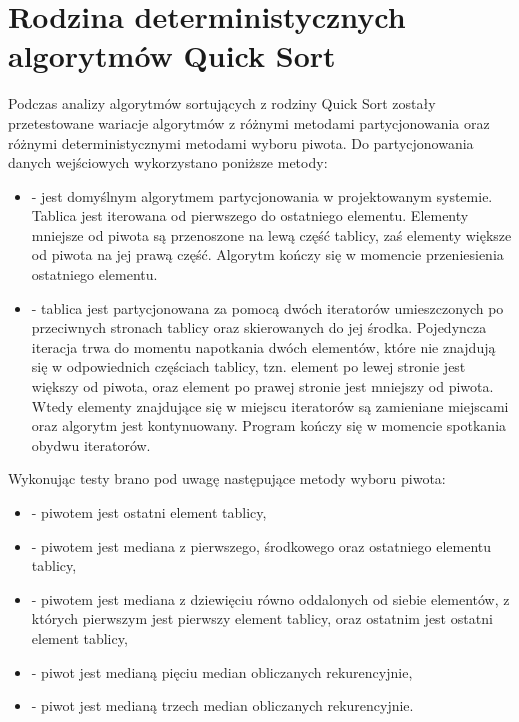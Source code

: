 \section{Rodzina deterministycznych algorytmów Quick Sort}
Podczas analizy algorytmów sortujących z rodziny Quick Sort zostały przetestowane wariacje algorytmów z różnymi metodami partycjonowania oraz różnymi deterministycznymi metodami wyboru piwota. Do partycjonowania danych wejściowych wykorzystano poniższe metody:

\begin{itemize}
	\setlength\itemsep{0em}
	\item {} - jest domyślnym algorytmem partycjonowania w projektowanym systemie. Tablica jest iterowana od pierwszego do ostatniego elementu. Elementy mniejsze od piwota są przenoszone na lewą część tablicy, zaś elementy większe od piwota na jej prawą część. Algorytm kończy się w momencie przeniesienia ostatniego elementu.
	\item {} - tablica jest partycjonowana za pomocą dwóch iteratorów umieszczonych po przeciwnych stronach tablicy oraz skierowanych do jej środka. Pojedyncza iteracja trwa do momentu napotkania dwóch elementów, które nie znajdują się w odpowiednich częściach tablicy, tzn. element po lewej stronie jest większy od piwota, oraz element po prawej stronie jest mniejszy od piwota. Wtedy elementy znajdujące się w miejscu iteratorów są zamieniane miejscami oraz algorytm jest kontynuowany. Program kończy się w momencie spotkania obydwu iteratorów.
\end{itemize}

Wykonując testy brano pod uwagę następujące metody wyboru piwota:
\begin{itemize}
	\setlength\itemsep{0em}
	\item {} - piwotem jest ostatni element tablicy,
	\item {} - piwotem jest mediana z pierwszego, środkowego oraz ostatniego elementu tablicy,
	\item {} - piwotem jest mediana z dziewięciu równo oddalonych od siebie elementów, z których pierwszym jest pierwszy element tablicy, oraz ostatnim jest ostatni element tablicy,
	\item {} - piwot jest medianą pięciu median obliczanych rekurencyjnie,
	\item {} - piwot jest medianą trzech median obliczanych rekurencyjnie.\\
\end{itemize}

